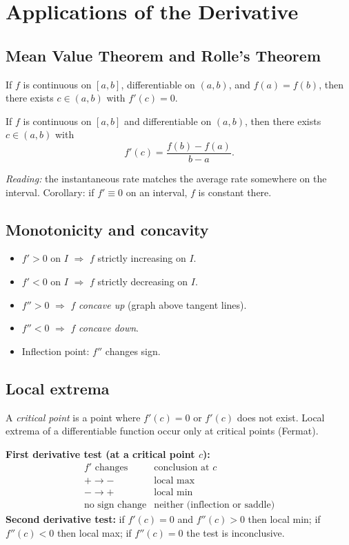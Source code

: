 \section{Applications of the Derivative}

\subsection{Mean Value Theorem and Rolle's Theorem}
\begin{theorem}[Rolle]
If $f$ is continuous on $[a,b]$, differentiable on $(a,b)$, and $f(a) = f(b)$, then there
exists $c \in (a,b)$ with $f'(c) = 0$.
\end{theorem}

\begin{theorem}
If $f$ is continuous on $[a,b]$ and differentiable on $(a,b)$, then there exists $c \in (a,b)$ with
\[ f'(c) = \frac{f(b) - f(a)}{b - a}. \]
\end{theorem}

\noindent\emph{Reading:} the instantaneous rate matches the average rate somewhere on the interval.
Corollary: if $f' \equiv 0$ on an interval, $f$ is constant there.

\subsection{Monotonicity and concavity}
\begin{itemize}[leftmargin=*,nosep]
  \item $f' > 0$ on $I$ $\Rightarrow$ $f$ strictly increasing on $I$.
  \item $f' < 0$ on $I$ $\Rightarrow$ $f$ strictly decreasing on $I$.
  \item $f'' > 0$ $\Rightarrow$ $f$ \emph{concave up} (graph above tangent lines).
  \item $f'' < 0$ $\Rightarrow$ $f$ \emph{concave down}.
  \item Inflection point: $f''$ changes sign.
\end{itemize}

\subsection{Local extrema}
A \emph{critical point} is a point where $f'(c) = 0$ or $f'(c)$ does not exist. Local extrema
of a differentiable function occur only at critical points (Fermat).

\begin{keybox}
\textbf{First derivative test (at a critical point $c$):}
\[
\begin{array}{l|l}
f' \text{ changes} & \text{conclusion at } c \\\hline
+ \to - & \text{local max} \\
- \to + & \text{local min} \\
\text{no sign change} & \text{neither (inflection or saddle)}
\end{array}
\]
\textbf{Second derivative test:} if $f'(c) = 0$ and $f''(c) > 0$ then local min;
if $f''(c) < 0$ then local max; if $f''(c) = 0$ the test is inconclusive.
\end{keybox}

